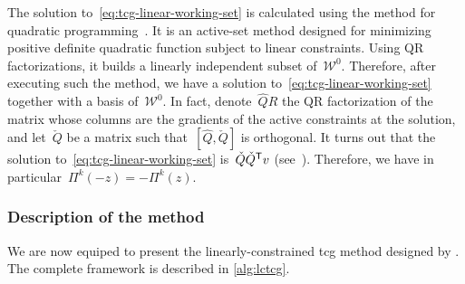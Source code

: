 The solution to~\cref{eq:tcg-linear-working-set} is calculated using the \citeauthor{Goldfarb_Idnani_1983} method for quadratic programming~\cite{Goldfarb_Idnani_1983}.
It is an active-set method designed for minimizing positive definite quadratic function subject to linear constraints.
Using QR factorizations, it builds a linearly independent subset of~$\mathcal{W}^0$.
Therefore, after executing such the \citeauthor{Goldfarb_Idnani_1983} method, we have a solution to~\cref{eq:tcg-linear-working-set} together with a basis of~$\mathcal{W}^0$.
In fact, denote~$\hat{Q}R$ the QR factorization of the matrix whose columns are the gradients of the active constraints at the solution, and let~$\check{Q}$ be a matrix such that~$[\hat{Q}, \check{Q}]$ is orthogonal.
It turns out that the solution to~\cref{eq:tcg-linear-working-set} is~$\check{Q} \check{Q}^{\mathsf{T}} v$ (see~\cite[Eq.~(3.7)]{Powell_2015}).
Therefore, we have in particular~$\Pi^k(-z) = -\Pi^k(z)$.

\subsubsection{Description of the  method}

We are now equiped to present the linearly-constrained \gls{tcg} method designed by \citeauthor{Powell_2015}.
The complete framework is described in \cref{alg:lctcg}.

